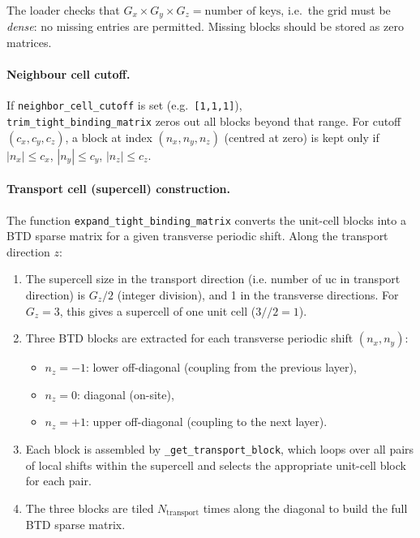 The loader checks that
$G_x \times G_y \times G_z = \text{number of keys}$, i.e.\ the grid
must be \emph{dense}: no missing entries are permitted.  Missing
blocks should be stored as zero matrices.

\paragraph{Neighbour cell cutoff.}
If \texttt{neighbor\_cell\_cutoff} is set (e.g.\ \texttt{[1,1,1]}),
\\\texttt{trim\_tight\_binding\_matrix} zeros out all blocks beyond that
range.  For cutoff $(c_x, c_y, c_z)$, a block at index
$(n_x, n_y, n_z)$ (centred at zero) is kept only if
$|n_x| \le c_x$, $|n_y| \le c_y$, $|n_z| \le c_z$.

\paragraph{Transport cell (supercell) construction.}
The function \texttt{expand\_tight\_binding\_matrix} converts the
unit-cell blocks into a BTD sparse matrix for a given transverse
periodic shift.  Along the transport direction $z$:
\begin{enumerate}
  \item The supercell size in the transport direction (i.e. number of uc in
        transport direction) is $G_z / 2$ (integer division), and 1 in the transverse
        directions.  For $G_z = 3$, this gives a supercell of one unit
        cell ($3 // 2 = 1$).
  \item Three BTD blocks are extracted for each transverse periodic
        shift $(n_x, n_y)$:
        \begin{itemize}
          \item $n_z = -1$: lower off-diagonal (coupling from the
                previous layer),
          \item $n_z =  0$: diagonal (on-site),
          \item $n_z = +1$: upper off-diagonal (coupling to the next
                layer).
        \end{itemize}
  \item Each block is assembled by \texttt{\_get\_transport\_block},
        which loops over all pairs of local shifts within the supercell
        and selects the appropriate unit-cell block for each pair.
  \item The three blocks are tiled $N_\text{transport}$ times along the
        diagonal to build the full BTD sparse matrix.
\end{enumerate}

